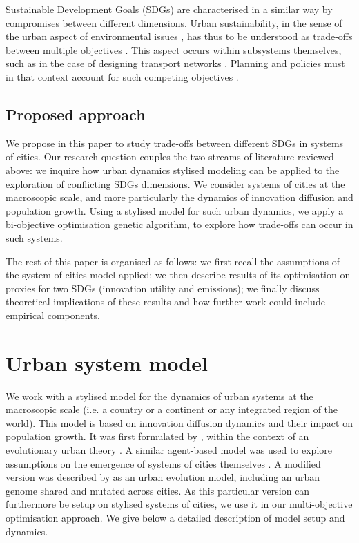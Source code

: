 \documentclass[final,5p,times,twocolumn,authoryear]{elsarticle}
\begin{document}
Sustainable Development Goals (SDGs) are characterised in a similar way by compromises between different dimensions. Urban sustainability, in the sense of the urban aspect of environmental issues \citep{finco2001pathways}, has thus to be understood as trade-offs between multiple objectives \citep{viguie2012trade}. This aspect occurs within subsystems themselves, such as in the case of designing transport networks \citep{sharma2011multiobjective}. Planning and policies must in that context account for such competing objectives \citep{caparros2015optimised}. 


\subsection{Proposed approach}

We propose in this paper to study trade-offs between different SDGs in systems of cities. Our research question couples the two streams of literature reviewed above: we inquire how urban dynamics stylised modeling can be applied to the exploration of conflicting SDGs dimensions. We consider systems of cities at the macroscopic scale, and more particularly the dynamics of innovation diffusion and population growth. Using a stylised model for such urban dynamics, we apply a bi-objective optimisation genetic algorithm, to explore how trade-offs can occur in such systems.

The rest of this paper is organised as follows: we first recall the assumptions of the system of cities model applied; we then describe results of its optimisation on proxies for two SDGs (innovation utility and emissions); we finally discuss theoretical implications of these results and how further work could include empirical components.



\section{Urban system model}

We work with a stylised model for the dynamics of urban systems at the macroscopic scale (i.e. a country or a continent or any integrated region of the world). This model is based on innovation diffusion dynamics and their impact on population growth. It was first formulated by \cite{favaro2011gibrat}, within the context of an evolutionary urban theory \citep{pumain1997pour}. A similar agent-based model was used to explore assumptions on the emergence of systems of cities themselves \citep{schmitt2015half}. A modified version was described by \cite{raimbault2020model} as an urban evolution model, including an urban genome shared and mutated across cities. As this particular version can furthermore be setup on stylised systems of cities, we use it in our multi-objective optimisation approach. We give below a detailed description of model setup and dynamics.
\end{document}
